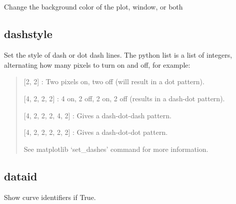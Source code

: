 \documentclass[letterpaper,10pt,english]{sphinxmanual}
\begin{document}
\subsection{}
\label{\detokenize{plot_control_cmds:bkgcolor-2-4}}
Change the background color of the plot, window, or both

\begin{sphinxVerbatim}[commandchars=\\\{\}]
\PYG{p}{[}\PYG{p}{]}  \PYG{p}{[}  \PYG{p}{]}   
\end{sphinxVerbatim}


\subsection{dashstyle}
\label{\detokenize{plot_control_cmds:dashstyle}}
Set the style of dash or dot dash lines. The python list is a list of integers, alternating how many pixels to turn on and off, for example:
\begin{quote}

{[}2, 2{]} : Two pixels on, two off (will result in a dot pattern).

{[}4, 2, 2, 2{]} : 4 on, 2 off, 2 on, 2 off (results in a dash-dot pattern).

{[}4, 2, 2, 2, 4, 2{]} : Gives a dash-dot-dash pattern.

{[}4, 2, 2, 2, 2, 2{]} : Gives a dash-dot-dot pattern.

See matplotlib ‘set\_dashes’ command for more information.
\end{quote}

\begin{sphinxVerbatim}[commandchars=\\\{\}]
\PYG{p}{[}\PYG{p}{]}   \PYG{p}{[}\PYG{p}{]}
\end{sphinxVerbatim}


\subsection{dataid}
\label{\detokenize{plot_control_cmds:dataid}}
Show curve identifiers if True. 
\end{document}
